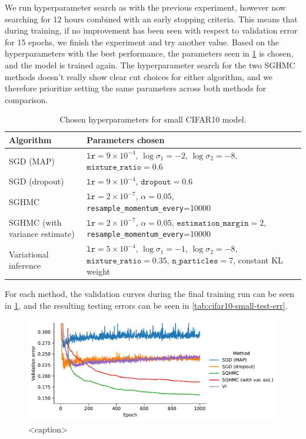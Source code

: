 We run hyperparameter search as with the previous experiment, however now searching for 12 hours combined with an early stopping criteria.
This means that during training, if no improvement has been seen with respect to validation error for 15 epochs, we finish the experiment and try another value.
Based on the hyperparameters with the best performance, the parameters seen in \cref{tab:cifar10-small-hparams} is chosen, and the model is trained again. 
The hyperparameter search for the two SGHMC methods doesn't really show clear cut choices for either algorithm, and we therefore prioritize setting the same parameters across both methods for comparison. 
\begin{table}[htbp]
    \centering
    \begin{tabular}{p{4cm}p{9cm}}
        \toprule
        Algorithm & Parameters chosen \\ \midrule
        SGD (MAP) & 
        $\texttt{lr}=9 \times 10^{-4}$, 
        $\log\sigma_1=-2$, 
        $\log\sigma_2=-8$, 
        $\texttt{mixture\_ratio}=0.6$ \\ \midrule
        SGD (dropout) & $\texttt{lr}=9\times 10^{-4}$,
        $\texttt{dropout}=0.6$ \\ \midrule
        SGHMC & $\texttt{lr}=2\times 10^{-7}$, $\alpha=0.05$, \texttt{resample\_momentum\_every}=10000 \\ \midrule
        SGHMC (with variance estimate) &  $\texttt{lr}= 2 \times 10^{-7}$, 
        $\alpha=0.05$,
        $\texttt{estimation\_margin}=2$, \texttt{resample\_momentum\_every}=10000 \\  \midrule
        Variational inference &    
        $\texttt{lr}=5 \times 10^{-4}$,
        $\log\sigma_1=-1$,
        $\log\sigma_2=-8$,
        $\texttt{mixture\_ratio}=0.35$,
        $\texttt{n\_particles}=7$, constant KL weight \\
        \bottomrule
    \end{tabular}
    \caption{Chosen hyperparameters for small CIFAR10 model.}
    \label{tab:cifar10-small-hparams}
\end{table}
For each method, the validation curves during the final training run can be seen in \cref{fig:cifar-small-final-runs-val}, and the resulting testing errors can be seen in \cref{tab:cifar10-small-test-err}.
\begin{figure}[htbp]
    \centering
    \includegraphics[width=\linewidth]{Figures/cifar-small-final-runs-val.pdf}    
    \caption{<caption>}
    \label{fig:cifar-small-final-runs-val}
\end{figure}
